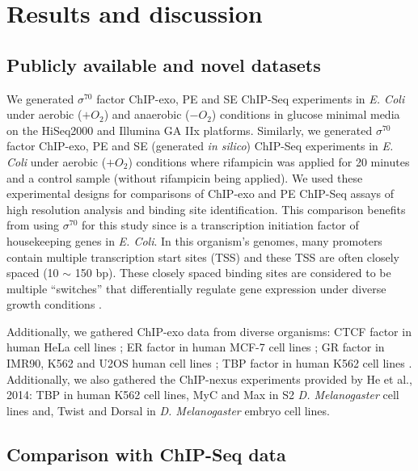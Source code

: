 \documentclass{bmcart}
\newcommand{\sig}{\sigma^{70}}
\begin{document}
\section*{Results and discussion}
\label{sec:results}

\subsection*{Publicly available and novel datasets}

We generated $\sig$ factor ChIP-exo, PE and SE ChIP-Seq experiments in
\emph{E. Coli} under aerobic ($+O_2$) and anaerobic ($-O_2$)
conditions in glucose minimal media on the HiSeq2000 and Illumina GA
IIx platforms. Similarly, we generated $\sig$ factor ChIP-exo, PE and
SE (generated \emph{in silico}) ChIP-Seq experiments in \emph{E. Coli}
under aerobic ($+O_2$) conditions where rifampicin was applied for 20
minutes and a control sample (without rifampicin being applied). We
used these experimental designs for comparisons of ChIP-exo and PE
ChIP-Seq assays of high resolution analysis and binding site
identification. This comparison benefits from using $\sig$ for this
study since is a transcription initiation factor of housekeeping genes
in \emph{E. Coli}. In this organism's genomes, many promoters contain
multiple transcription start sites (TSS) and these TSS are often
closely spaced (10 $\sim$ 150 bp). These closely spaced binding sites
are considered to be multiple ``switches'' that differentially
regulate gene expression under diverse growth conditions
\cite{regulondb}.

Additionally, we gathered ChIP-exo data from diverse organisms: CTCF
factor in human HeLa cell lines \cite{exo1}; ER factor in human MCF-7
cell lines \cite{exoillumina}; GR factor in IMR90, K562 and U2OS human
cell lines \cite{starick15}; TBP factor in human K562 cell lines
\cite{venters13}. Additionally, we also gathered the ChIP-nexus
experiments provided by He et al., 2014: TBP in human K562 cell lines,
MyC and Max in S2 \emph{D. Melanogaster} cell lines and, Twist and
Dorsal in \emph{D. Melanogaster} embryo cell lines.

\subsection*{Comparison with ChIP-Seq data}
\end{document}
